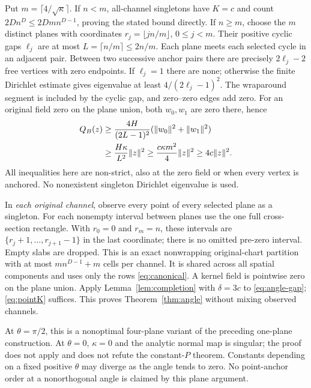 Put $m=\lceil4/\sqrt\kappa\rceil$. If $n<m$, all-channel singletons have
$K=c$ and count $2Dn^D\leq2Dm n^{D-1}$, proving the stated bound directly.
If $n\geq m$, choose the $m$ distinct planes with coordinates
$r_j=\lfloor jn/m\rfloor$, $0\leq j<m$. Their positive cyclic gaps $\ell_j$
are at most $L=\lceil n/m\rceil\leq2n/m$.
Each plane meets each selected cycle in an adjacent pair. Between two
successive anchor pairs there are precisely $2\ell_j-2$ free vertices with
zero endpoints. If $\ell_j=1$ there are none; otherwise the finite Dirichlet
estimate gives eigenvalue at least $4/(2\ell_j-1)^2$.
The wraparound segment is included by the cyclic gap, and zero--zero edges
add zero. For an original field zero on the plane union, both $w_0,w_1$
are zero there, hence
\begin{align}\label{eq:angle-gap}
 Q_B(z)&\geq\frac{4H}{(2L-1)^2}
                      (\lVert w_0\rVert^2+\lVert w_1\rVert^2)\nonumber\\
 &\geq\frac{H\kappa}{L^2}\lVert z\rVert^2
 \geq\frac{c\kappa m^2}{4}\lVert z\rVert^2\geq4c\lVert z\rVert^2.
\end{align}
All inequalities here are non-strict, also at the zero field or when every
vertex is anchored. No nonexistent singleton Dirichlet eigenvalue is used.

In \emph{each original channel}, observe every point of every selected plane
as a singleton. For each nonempty interval between planes use the one full
cross-section rectangle. With $r_0=0$ and $r_m=n$, these intervals are
$\{r_j+1,\ldots,r_{j+1}-1\}$ in the last coordinate; there is no omitted
pre-zero interval. Empty slabs are dropped. This is an exact nonwrapping
original-chart partition with at most $mn^{D-1}+m$ cells per channel.
It is shared across all spatial components and uses only the rows
\eqref{eq:canonical}. A kernel field is pointwise zero on the plane union.
Apply Lemma~\ref{lem:completion} with $\delta=3c$ to
\eqref{eq:angle-gap}; \eqref{eq:pointK} suffices.
This proves Theorem~\ref{thm:angle} without mixing observed channels.

At $\theta=\pi/2$, this is a nonoptimal four-plane variant of the preceding
one-plane construction. At $\theta=0$, $\kappa=0$ and the analytic normal map
is singular; the proof does not apply and does not refute the constant-$P$
theorem. Constants depending on a fixed positive $\theta$ may diverge as the
angle tends to zero. No point-anchor order at a nonorthogonal angle is claimed
by this plane argument.
